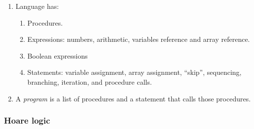 \documentclass[11pt]{article}
\begin{document}
\begin{enumerate}

 \item Language has:

 \begin{enumerate}

  \item Procedures.

  \item Expressions: numbers, arithmetic, variables reference and array reference.

  \item Boolean expressions

  \item Statements: variable assignment, array assignment, ``skip'', sequencing, branching, iteration, and procedure calls.

 \end{enumerate}

 \item A \emph{program} is a list of procedures and a statement that calls those procedures.

\end{enumerate}

\subsubsection*{Hoare logic}
\end{document}
